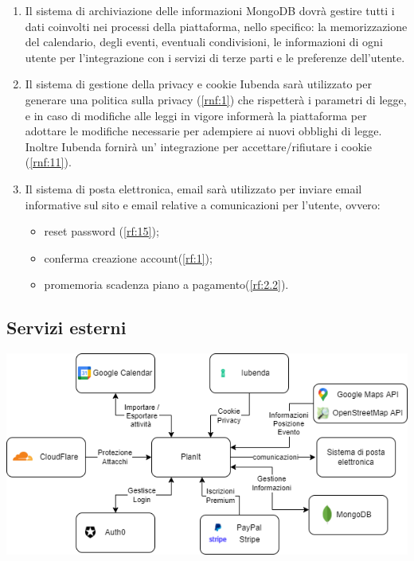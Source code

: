 \begin{enumerate}
    \item Il sistema di archiviazione delle informazioni MongoDB dovrà gestire tutti i dati coinvolti nei processi della piattaforma, nello specifico: la memorizzazione del calendario, degli eventi, eventuali condivisioni, le informazioni di ogni utente per l'integrazione con i servizi di terze parti e le preferenze dell'utente.

    \item Il sistema di gestione della privacy e cookie Iubenda sarà utilizzato per generare una politica sulla privacy (\ref{rnf:1}) che rispetterà i parametri di legge, e in caso di modifiche alle leggi in vigore informerà la piattaforma per adottare le modifiche necessarie per adempiere ai nuovi obblighi di legge. Inoltre Iubenda fornirà un' integrazione per accettare/rifiutare i cookie (\ref{rnf:11}).
    
    \item Il sistema di posta elettronica, email sarà utilizzato per inviare email informative sul sito e email relative a comunicazioni per l'utente, ovvero: 
    \begin{itemize}
        \item reset password (\ref{rf:15});
        \item conferma creazione account(\ref{rf:1});
        \item promemoria scadenza piano a pagamento(\ref{rf:2.2}).
    \end{itemize}
\end{enumerate}

\subsection*{Servizi esterni}
\begin{center}
    \includegraphics[width=1\textwidth]{img/Servizi/Servizi esterni.drawio.png}
\end{center}